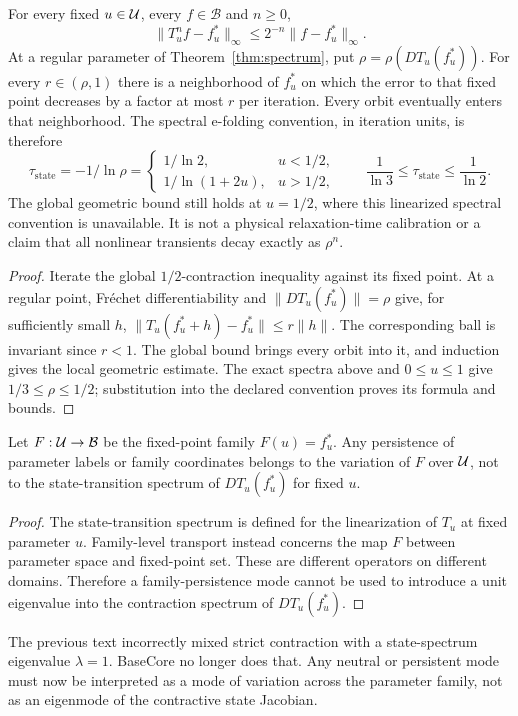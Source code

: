 \begin{theorem}\label{thm:relaxation}
For every fixed $u\in\mathcal{U}$, every $f\in\mathcal B$ and $n\geq0$,
\[
 \|T_u^n f-f_u^*\|_\infty\leq2^{-n}\|f-f_u^*\|_\infty.
\]
At a regular parameter of Theorem~\ref{thm:spectrum}, put
$\rho=\rho(DT_u(f_u^*))$. For every $r\in(\rho,1)$ there is a neighborhood
of $f_u^*$ on which the error to that fixed point decreases by a factor at
most $r$ per iteration. Every orbit eventually enters that neighborhood.
The spectral e-folding convention, in iteration units, is therefore
\[
 \tau_{\mathrm{state}}=-1/\ln\rho
 =\begin{cases}1/\ln2,&u<1/2,\\
 1/\ln(1+2u),&u>1/2,
 \end{cases}
 \qquad \frac1{\ln3}\leq\tau_{\mathrm{state}}\leq\frac1{\ln2}.
\]
The global geometric bound still holds at $u=1/2$, where this linearized
spectral convention is unavailable. It is not a physical relaxation-time
calibration or a claim that all nonlinear transients decay exactly as $\rho^n$.
\end{theorem}

\begin{proof}
Iterate the global $1/2$-contraction inequality against its fixed point.
At a regular point, Fr\'echet differentiability and $\|DT_u(f_u^*)\|=\rho$
give, for sufficiently small $h$, $\|T_u(f_u^*+h)-f_u^*\|\leq r\|h\|$.
The corresponding ball is invariant since $r<1$. The global bound brings
every orbit into it, and induction gives the local geometric estimate.
The exact spectra above and $0\leq u\leq1$ give $1/3\leq\rho\leq1/2$;
substitution into the declared convention proves its formula and bounds.
\end{proof}

\begin{proposition}
Let $F:\mathcal{U}\to\mathcal{B}$ be the fixed-point family $F(u)=f_u^\ast$. Any persistence of parameter labels or family coordinates belongs to the variation of $F$ over $\mathcal{U}$, not to the state-transition spectrum of $DT_u(f_u^\ast)$ for fixed $u$.
\end{proposition}

\begin{proof}
The state-transition spectrum is defined for the linearization of $T_u$ at fixed parameter $u$. Family-level transport instead concerns the map $F$ between parameter space and fixed-point set. These are different operators on different domains. Therefore a family-persistence mode cannot be used to introduce a unit eigenvalue into the contraction spectrum of $DT_u(f_u^\ast)$.
\end{proof}

\begin{remark}
The previous text incorrectly mixed strict contraction with a state-spectrum eigenvalue $\lambda=1$. BaseCore no longer does that. Any neutral or persistent mode must now be interpreted as a mode of variation across the parameter family, not as an eigenmode of the contractive state Jacobian.
\end{remark}
